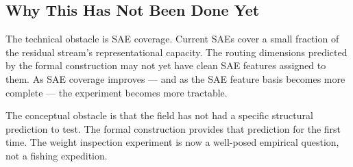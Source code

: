 \subsection*{Why This Has Not Been Done Yet}

The technical obstacle is SAE coverage. Current SAEs cover a small fraction
of the residual stream's representational capacity. The routing dimensions
predicted by the formal construction may not yet have clean SAE features
assigned to them. As SAE coverage improves --- and as the SAE feature basis
becomes more complete --- the experiment becomes more tractable.

The conceptual obstacle is that the field has not had a specific structural
prediction to test. The formal construction provides that prediction for the
first time. The weight inspection experiment is now a well-posed empirical
question, not a fishing expedition.